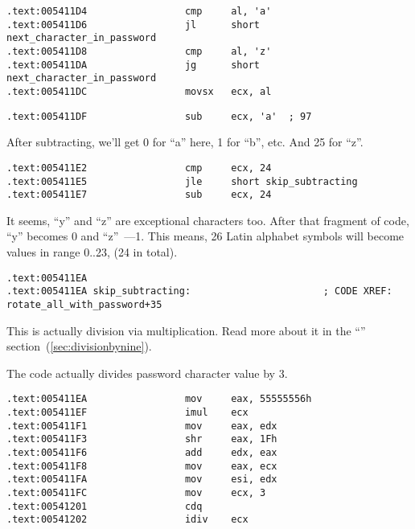 \begin{lstlisting}
.text:005411D4                 cmp     al, 'a'
.text:005411D6                 jl      short next_character_in_password
.text:005411D8                 cmp     al, 'z'
.text:005411DA                 jg      short next_character_in_password
.text:005411DC                 movsx   ecx, al
\end{lstlisting}


\begin{lstlisting}
.text:005411DF                 sub     ecx, 'a'  ; 97
\end{lstlisting}

{After subtracting, we'll get 0 for ``a'' here, 1 for ``b'', etc. And 25 for ``z''.}

\begin{lstlisting}
.text:005411E2                 cmp     ecx, 24
.text:005411E5                 jle     short skip_subtracting
.text:005411E7                 sub     ecx, 24
\end{lstlisting}

{It seems, ``y'' and ``z'' are exceptional characters too. 
After that fragment of code, ``y'' becomes 0 and ``z''~---1. 
This means, 26 Latin alphabet symbols will become values in range 0..23, (24 in total).}

\begin{lstlisting}
.text:005411EA
.text:005411EA skip_subtracting:                       ; CODE XREF: rotate_all_with_password+35
\end{lstlisting}

{This is actually division via multiplication. 
Read more about it in the ``\DivisionByNineSectionName'' section~(\ref{sec:divisionbynine}).}

{The code actually divides password character value by 3.}

\begin{lstlisting}
.text:005411EA                 mov     eax, 55555556h
.text:005411EF                 imul    ecx
.text:005411F1                 mov     eax, edx
.text:005411F3                 shr     eax, 1Fh
.text:005411F6                 add     edx, eax
.text:005411F8                 mov     eax, ecx
.text:005411FA                 mov     esi, edx
.text:005411FC                 mov     ecx, 3
.text:00541201                 cdq
.text:00541202                 idiv    ecx
\end{lstlisting}

